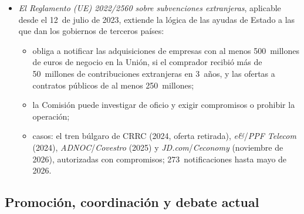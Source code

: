 \documentclass[11pt]{article}
\begin{document}
\begin{itemize}
\item \emph{El Reglamento (UE) 2022/2560 sobre subvenciones extranjeras}, aplicable desde el 12~de julio de 2023, extiende la lógica de las ayudas de Estado a las que dan los gobiernos de terceros países\nocite{UE2022Subvenciones}:
  \begin{itemize}
  \item obliga a notificar las adquisiciones de empresas con al menos 500~millones de euros de negocio en la Unión, si el comprador recibió más de 50~millones de contribuciones extranjeras en 3~años, y las ofertas a contratos públicos de al menos 250~millones;
  \item la Comisión puede investigar de oficio y exigir compromisos o prohibir la operación;
  \item casos: el tren búlgaro de CRRC (2024, oferta retirada), \emph{e\&}/\emph{PPF Telecom} (2024), \emph{ADNOC}/\emph{Covestro} (2025) y \emph{JD.com}/\emph{Ceconomy} (noviembre de 2026), autorizadas con compromisos; 273~notificaciones hasta mayo de 2026\nocite{CE2026Subvenciones}.
  \end{itemize}
\end{itemize}

\subsection{Promoción, coordinación y debate actual}\label{sec:promocion}
\end{document}
